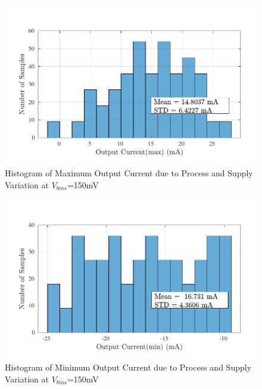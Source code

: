\begin{figure} [H]
\centering
\includegraphics[scale=1]{Figures/Corners/Overall/PV_Min/PDFs/PV_Min_imax.pdf}
\caption{Histogram of Maximum Output Current due to Process and Supply Variation at $V_{bias}$=150mV}
\end{figure}

\begin{figure} [H]
\centering
\includegraphics[scale=1]{Figures/Corners/Overall/PV_Min/PDFs/PV_Min_imin.pdf}
\caption{Histogram of Minimum Output Current due to Process and Supply Variation at $V_{bias}$=150mV}
\end{figure}

